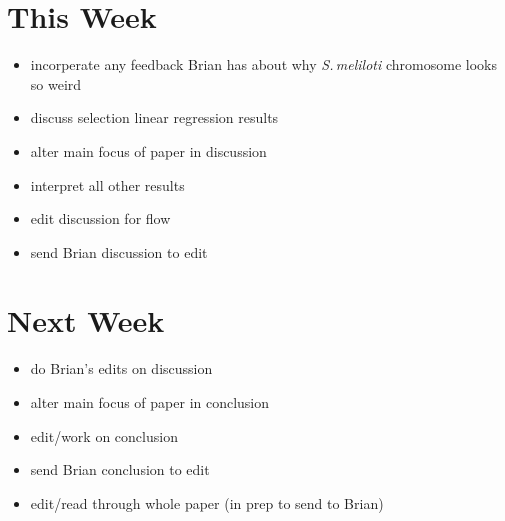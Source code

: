 \documentclass[12pt]{article}
\newcommand{\smel}{\textit{S.\,meliloti}\xspace}
\begin{document}

\section*{This Week}
%
\begin{itemize}
	\item incorperate any feedback Brian has about why \smel chromosome looks so weird
	\item discuss selection linear regression results
	\item alter main focus of paper in discussion
	\item interpret all other results
	\item edit discussion for flow
	\item send Brian discussion to edit
\end{itemize}


\section*{Next Week}
\begin{itemize}
	\item do Brian's edits on discussion
	\item alter main focus of paper in conclusion
	\item edit/work on conclusion
	\item send Brian conclusion to edit
	\item edit/read through whole paper (in prep to send to Brian)
\end{itemize}

\newpage
\end{document}
